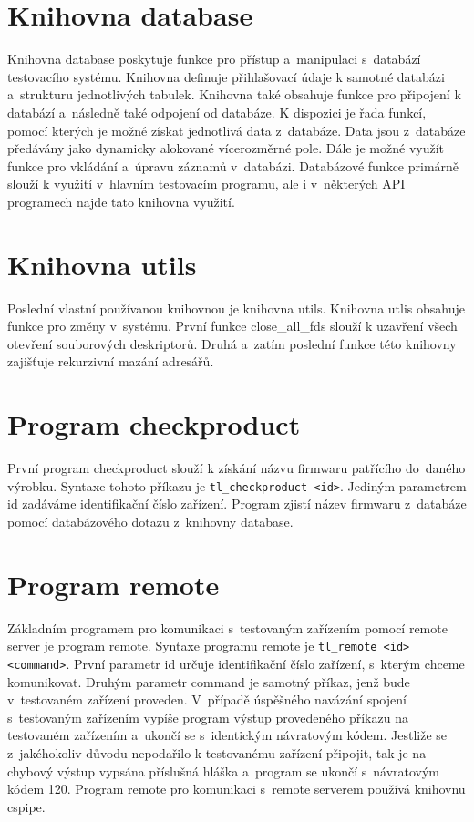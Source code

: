 \section{Knihovna database}
Knihovna database poskytuje funkce pro přístup a~manipulaci s~databází testovacího systému. Knihovna definuje přihlašovací údaje k samotné databázi a~strukturu jednotlivých tabulek. Knihovna také obsahuje funkce pro připojení k databází a~následně také odpojení od databáze. K dispozici je řada funkcí, pomocí kterých je možné získat jednotlivá data z~databáze. Data jsou z~databáze předávány jako dynamicky alokované vícerozměrné pole. Dále je možné využít funkce pro vkládání a~úpravu záznamů v~databázi. Databázové funkce primárně slouží k využití v~hlavním testovacím programu, ale i v~některých API programech najde tato knihovna využití.

\section{Knihovna utils}
Poslední vlastní používanou knihovnou je knihovna utils. Knihovna utlis obsahuje funkce pro změny v~systému. První funkce close\_all\_fds slouží k uzavření všech otevření souborových deskriptorů. Druhá a~zatím poslední funkce této knihovny zajišťuje rekurzivní mazání adresářů.

\section{Program checkproduct}
První program checkproduct slouží k získání názvu firmwaru patřícího do~daného výrobku. Syntaxe tohoto příkazu je \texttt{tl\_checkproduct <id>}. Jediným parametrem id zadáváme identifikační číslo zařízení. Program zjistí název firmwaru z~databáze pomocí databázového dotazu z~knihovny database.

\section{Program remote}
Základním programem pro komunikaci s~testovaným zařízením pomocí remote server je program remote. Syntaxe programu remote je \texttt{tl\_remote <id> <command>}. První parametr id určuje identifikační číslo zařízení, s~kterým chceme komunikovat. Druhým parametr command je samotný příkaz, jenž bude v~testovaném zařízení proveden. V~případě úspěšného navázání spojení s~testovaným zařízením vypíše program výstup provedeného příkazu na testovaném zařízením a~ukončí se s~identickým návratovým kódem. Jestliže se z~jakéhokoliv důvodu nepodařilo k testovanému zařízení připojit, tak je na chybový výstup vypsána příslušná hláška a~program se ukončí s~návratovým kódem 120. Program remote pro komunikaci s~remote serverem používá knihovnu cspipe.

